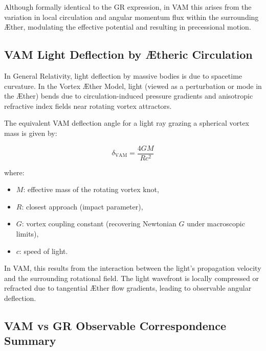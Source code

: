 Although formally identical to the GR expression, in VAM this arises from the variation in local circulation and angular momentum flux within the surrounding Æther, modulating the effective potential and resulting in precessional motion.
\subsection*{VAM Light Deflection by Ætheric Circulation}

In General Relativity, light deflection by massive bodies is due to spacetime curvature. In the Vortex Æther Model, light (viewed as a perturbation or mode in the Æther) bends due to circulation-induced pressure gradients and anisotropic refractive index fields near rotating vortex attractors.

The equivalent VAM deflection angle for a light ray grazing a spherical vortex mass is given by:

\begin{equation}
    \delta_{\text{VAM}} =
    \frac{4 G M}{R c^2}
\end{equation}

where:
\begin{itemize}
    \item \( M \): effective mass of the rotating vortex knot,
    \item \( R \): closest approach (impact parameter),
    \item \( G \): vortex coupling constant (recovering Newtonian \( G \) under macroscopic limits),
    \item \( c \): speed of light.
\end{itemize}

In VAM, this results from the interaction between the light's propagation velocity and the surrounding rotational field. The light wavefront is locally compressed or refracted due to tangential Æther flow gradients, leading to observable angular deflection.
\subsection*{VAM vs GR Observable Correspondence Summary}


